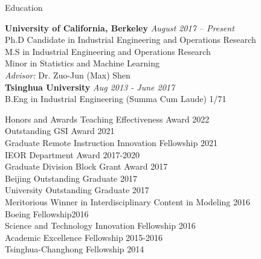 \documentclass{resume} %
\begin{document}

\begin{rSection}{Education}

{\bf University of California, Berkeley} \hfill {\em August 2017 -- Present} 
\\ Ph.D Candidate in Industrial Engineering and Operations Research \hfill 
\\ M.S in Industrial Engineering and Operations Research
\\ Minor in Statistics and Machine Learning
\\ {\textit{Advisor:} Dr. Zuo-Jun (Max) Shen} 
\\{\bf Tsinghua University} \hfill {\em Aug 2013 - June 2017} 
\\ B.Eng in Industrial Engineering (Summa Cum Laude) \hfill { 1/71 }
\end{rSection}

\begin{rSection}{Honors and Awards}
Teaching Effectiveness Award \hfill {2022}\\
Outstanding GSI Award \hfill {2021}\\
Graduate Remote Instruction Innovation Fellowship \hfill {2021}\\
IEOR Department Award \hfill {2017-2020}\\
Graduate Division Block Grant Award \hfill {2017}\\
Beijing Outstanding Graduate \hfill {2017}\\
University Outstanding Graduate \hfill {2017}\\
Meritorious Winner in Interdisciplinary Content in Modeling  \hfill {2016}\\
Boeing Fellowship\hfill {2016}\\
Science and Technology Innovation Fellowship \hfill {2016}\\
Academic Excellence Fellowship \hfill {2015-2016}\\
Tsinghua-Changhong Fellowship \hfill{2014}
\end{rSection}
\end{document}
